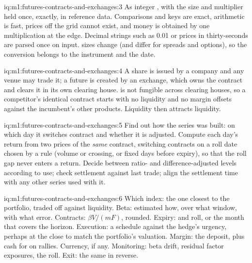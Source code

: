 \begin{solution}{iq:m1:futures-contracts-and-exchanges:3}
As integer , with the  size and multiplier held once, exactly, in
reference data. Comparisons and keys are exact, arithmetic is fast, prices
off the grid cannot exist, and money is obtained by one multiplication at
the edge. Decimal strings such as 0.01 or prices in thirty-seconds are
parsed once on input.  sizes change (and differ for spreads and
options), so the conversion belongs to the instrument and the date.
\end{solution}

\begin{solution}{iq:m1:futures-contracts-and-exchanges:4}
A share is issued by a company and any venue may trade it; a future is
created by an exchange, which owns the contract and clears it in its own
clearing house.  is not fungible across clearing houses, so a
competitor's identical contract starts with no liquidity and no margin
offsets against the incumbent's other products. Liquidity then attracts
liquidity.
\end{solution}

\begin{solution}{iq:m1:futures-contracts-and-exchanges:5}
Find out how the series was built: on which day it switches contract and
whether it is adjusted. Compute each day's return from two prices of the
\emph{same} contract, switching contracts on a roll date chosen by a rule
(volume or  crossing, or fixed days before expiry), so that the
roll gap never enters a return. Decide between ratio- and
difference-adjusted levels according to use; check settlement against last
trade; align the settlement time with any other series used with it.
\end{solution}

\begin{solution}{iq:m1:futures-contracts-and-exchanges:6}
Which index: the one closest to the portfolio, traded off against liquidity.
Beta: estimated how, over what window, with what error. Contracts: $\beta
V/(mF)$, rounded. Expiry:  and roll, or the month that covers the
horizon. Execution: a schedule against the hedge's urgency, perhaps at the
close to match the portfolio's valuation. Margin: the deposit, plus cash for
 on rallies. Currency, if any. Monitoring: beta drift,
residual factor exposures, the roll. Exit: the same in reverse.
\end{solution}
